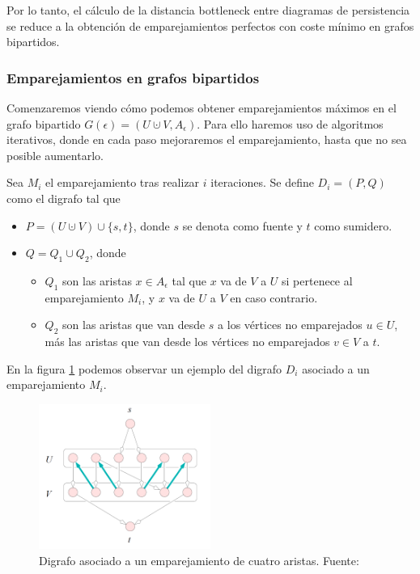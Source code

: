 Por lo tanto, el cálculo de la distancia bottleneck entre diagramas de persistencia se reduce a la obtención de emparejamientos perfectos con coste mínimo en grafos bipartidos.

\subsubsection*{Emparejamientos en grafos bipartidos}
Comenzaremos viendo cómo podemos obtener emparejamientos máximos en el grafo bipartido $G(\epsilon)=(U \cupdot V, A_\epsilon)$. Para ello haremos uso de algoritmos iterativos, donde en cada paso mejoraremos el emparejamiento, hasta que no sea posible aumentarlo.

\begin{definition}
Sea $M_i$ el emparejamiento tras realizar $i$ iteraciones. Se define $D_i = (P, Q)$ como el digrafo tal que
\begin{itemize}
	\item $P= (U \cupdot V) \cup \{s, t\}$, donde $s$ se denota como fuente y $t$ como sumidero.
	\item $Q = Q_1 \cup Q_2$, donde 
	\begin{itemize}
		\item $Q_1$ son las aristas $x \in A_\epsilon$ tal que $x$ va de $V$ a $U$ si pertenece al emparejamiento $M_i$, y $x$ va de $U$ a $V$ en caso contrario.
		\item $Q_2$ son las aristas que van desde $s$ a los vértices no emparejados $u \in U$, más las aristas que van desde los vértices no emparejados $v \in V$ a $t$.
	\end{itemize}
\end{itemize}

\end{definition}

En la figura \ref{ref:ejEmparejamiento} podemos observar un ejemplo del digrafo $D_i$ asociado a un emparejamiento $M_i$.

\begin{figure}[!ht]
\centering
\includegraphics[width=0.5\textwidth]{include/figuras/emparejamiento.png} 
\caption{Digrafo asociado a un emparejamiento de cuatro aristas. Fuente: \cite{libroEH}}
\label{ref:ejEmparejamiento}
\end{figure}  

